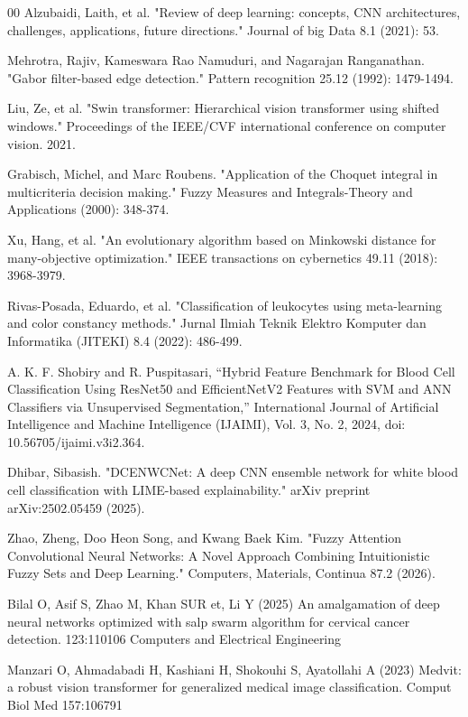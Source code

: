 \documentclass[12pt]{article}
\begin{document}
\begin{thebibliography}{00}
Alzubaidi, Laith, et al. "Review of deep learning: concepts, CNN architectures, challenges, applications, 
future directions." Journal of big Data 8.1 (2021): 53.

Mehrotra, Rajiv, Kameswara Rao Namuduri, and Nagarajan Ranganathan. "Gabor filter-based edge detection." Pattern recognition 25.12 (1992): 1479-1494.

Liu, Ze, et al. "Swin transformer: Hierarchical vision transformer using shifted windows." Proceedings of the IEEE/CVF international conference on computer vision. 2021.

Grabisch, Michel, and Marc Roubens. "Application of the Choquet integral in multicriteria decision making." Fuzzy Measures and Integrals-Theory and Applications (2000): 348-374.

Xu, Hang, et al. "An evolutionary algorithm based on Minkowski distance for many-objective optimization." IEEE transactions on cybernetics 49.11 (2018): 3968-3979.

Rivas-Posada, Eduardo, et al. "Classification of leukocytes using meta-learning and color constancy methods." Jurnal Ilmiah Teknik Elektro Komputer dan Informatika (JITEKI) 8.4 (2022): 486-499.

A. K. F. Shobiry and R. Puspitasari,
``Hybrid Feature Benchmark for Blood Cell Classification Using ResNet50 and EfficientNetV2 Features with SVM and ANN Classifiers via Unsupervised Segmentation,''
International Journal of Artificial Intelligence and Machine Intelligence (IJAIMI),
Vol. 3, No. 2, 2024, doi: 10.56705/ijaimi.v3i2.364.

Dhibar, Sibasish. "DCENWCNet: A deep CNN ensemble network for white blood cell classification with LIME-based explainability." arXiv preprint arXiv:2502.05459 (2025).

Zhao, Zheng, Doo Heon Song, and Kwang Baek Kim. "Fuzzy Attention Convolutional Neural Networks: A Novel Approach Combining Intuitionistic Fuzzy Sets and Deep Learning." Computers, Materials,  Continua 87.2 (2026).

Bilal O, Asif S, Zhao M, Khan SUR et, Li Y (2025) An amalgamation of deep neural networks optimized with salp swarm algorithm for cervical cancer detection. 123:110106 Computers and Electrical Engineering

Manzari O, Ahmadabadi H, Kashiani H, Shokouhi S, Ayatollahi A (2023) Medvit: a robust vision transformer for generalized medical image classification. Comput Biol Med 157:106791


\end{thebibliography}
\end{document}
